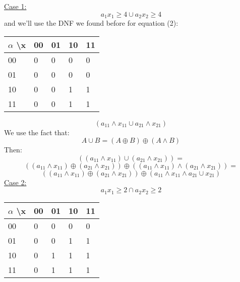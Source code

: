 \documentclass[11pt]{article}
\begin{document}
\underline{Case 1:}
\begin{equation}  a_1 x_1 \geq 4 \cup a_2 x_2 \geq 4\end{equation} and we'll use the DNF we found before for equation (2):
\begin{table}[ht!]
\centering
\begin{tabular}{ | m{1cm} | m{.8cm} | m{.8cm} | m{.8cm}| m{.8cm} | } 
  \hline
  $\alpha$ \textbackslash  x & 00 & 01 & 10 & 11 \\ [1 ex] 
 \hline\hline
 00 & 0 & 0 & 0 & 0\\ 
01 & 0 & 0 & 0 & 0\\
 10 & 0 & 0 & 1 & 1 \\
 11 & 0 & 0 & 1 & 1\\ [1ex] 
 \hline
\end{tabular}
\label{table2:data}
\end{table}
\begin{equation*}
(a_{11} \wedge x_{11} \cup a_{21} \wedge x_{21})
\end{equation*}
 We use the fact that:
 \begin{equation*}
     A\cup B=(A\oplus B) \oplus (A\wedge B)
 \end{equation*}
 Then:
 \begin{equation*}
   ((a_{11} \wedge x_{11} )\cup (a_{21} \wedge x_{21}))= \end{equation*}  \begin{equation*}
        ((a_{11} \wedge x_{11})\oplus(a_{21} \wedge x_{21}))\oplus ((a_{11} \wedge x_{11} )\wedge (a_{21} \wedge x_{21}))=
    \end{equation*} \begin{equation*}
        ((a_{11} \wedge x_{11})\oplus(a_{21} \wedge x_{21}))\oplus (a_{11} \wedge x_{11} \wedge a_{21} \cup x_{21})
    \end{equation*}
     \underline{Case 2:}
\begin{equation}  a_1 x_1 \geq 2 \cap a_2 x_2 \geq 2\end{equation}
\begin{table}[ht!]
\centering
\begin{tabular}{ | m{1cm} | m{.8cm} | m{.8cm} | m{.8cm}| m{.8cm} | } 
  \hline
  $\alpha$ \textbackslash  x & 00 & 01 & 10 & 11 \\ [1 ex] 
 \hline\hline
 00 & 0 & 0 & 0 & 0\\ 
01 & 0 & 0 & 1 & 1\\
10 & 0 & 1 & 1 & 1 \\
11 & 0 & 1 & 1 & 1\\ [1ex] 
 \hline
\end{tabular}
\end{table}
\end{document}
